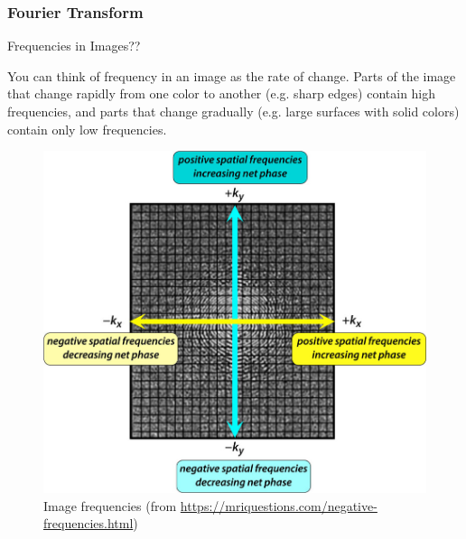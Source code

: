 \begin{frame}
    \frametitle{Fourier Transform}
    Frequencies in Images?? \newline

    \begin{center}
        You can think of frequency in an image as the rate of change. Parts of the image that change rapidly from one color to another (e.g. sharp edges) contain high frequencies, and parts that change gradually (e.g. large surfaces with solid colors) contain only low frequencies.
    \end{center}

     \begin{figure}[]
        \centering
        \includegraphics[height=0.5\textheight]{images/kspace.jpg}
        \caption{Image frequencies (from \url{https://mriquestions.com/negative-frequencies.html})}
    \end{figure}
\end{frame}






